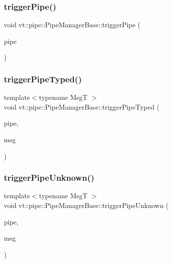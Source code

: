 \subsubsection{\texorpdfstring{trigger\+Pipe()}{triggerPipe()}}
{\footnotesize\ttfamily void vt\+::pipe\+::\+Pipe\+Manager\+Base\+::trigger\+Pipe (\begin{DoxyParamCaption}\item[{\hyperlink{namespacevt_ac9852acda74d1896f48f406cd72c7bd3}{Pipe\+Type} const \&}]{pipe }\end{DoxyParamCaption})\hspace{0.3cm}{\ttfamily [protected]}}

\mbox{\label{structvt_1_1pipe_1_1_pipe_manager_base_a34492ef027a92525ca5acc4e86b360ce}} 
\subsubsection{\texorpdfstring{trigger\+Pipe\+Typed()}{triggerPipeTyped()}}
{\footnotesize\ttfamily template$<$typename MsgT $>$ \\
void vt\+::pipe\+::\+Pipe\+Manager\+Base\+::trigger\+Pipe\+Typed (\begin{DoxyParamCaption}\item[{\hyperlink{namespacevt_ac9852acda74d1896f48f406cd72c7bd3}{Pipe\+Type} const \&}]{pipe,  }\item[{MsgT $\ast$}]{msg }\end{DoxyParamCaption})\hspace{0.3cm}{\ttfamily [protected]}}

\mbox{\label{structvt_1_1pipe_1_1_pipe_manager_base_ad21185d07e9c3a0206d3d5a791f668a3}} 
\subsubsection{\texorpdfstring{trigger\+Pipe\+Unknown()}{triggerPipeUnknown()}}
{\footnotesize\ttfamily template$<$typename MsgT $>$ \\
void vt\+::pipe\+::\+Pipe\+Manager\+Base\+::trigger\+Pipe\+Unknown (\begin{DoxyParamCaption}\item[{\hyperlink{namespacevt_ac9852acda74d1896f48f406cd72c7bd3}{Pipe\+Type} const \&}]{pipe,  }\item[{MsgT $\ast$}]{msg }\end{DoxyParamCaption})\hspace{0.3cm}{\ttfamily [protected]}}




